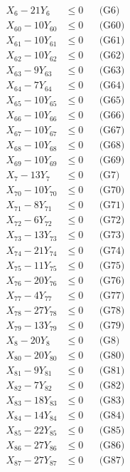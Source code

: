 \documentclass[a4paper,10pt]{article}
\begin{document}
{\begin{align}
X_{6} - 21Y_{6} &\leq 0 && \text{(G6)} \\
X_{60} - 10Y_{60} &\leq 0 && \text{(G60)} \\
X_{61} - 10Y_{61} &\leq 0 && \text{(G61)} \\
X_{62} - 10Y_{62} &\leq 0 && \text{(G62)} \\
X_{63} - 9Y_{63} &\leq 0 && \text{(G63)} \\
X_{64} - 7Y_{64} &\leq 0 && \text{(G64)} \\
X_{65} - 10Y_{65} &\leq 0 && \text{(G65)} \\
X_{66} - 10Y_{66} &\leq 0 && \text{(G66)} \\
X_{67} - 10Y_{67} &\leq 0 && \text{(G67)} \\
X_{68} - 10Y_{68} &\leq 0 && \text{(G68)} \\
X_{69} - 10Y_{69} &\leq 0 && \text{(G69)} \\
X_{7} - 13Y_{7} &\leq 0 && \text{(G7)} \\
\allowbreak
X_{70} - 10Y_{70} &\leq 0 && \text{(G70)} \\
X_{71} - 8Y_{71} &\leq 0 && \text{(G71)} \\
X_{72} - 6Y_{72} &\leq 0 && \text{(G72)} \\
X_{73} - 13Y_{73} &\leq 0 && \text{(G73)} \\
X_{74} - 21Y_{74} &\leq 0 && \text{(G74)} \\
X_{75} - 11Y_{75} &\leq 0 && \text{(G75)} \\
X_{76} - 20Y_{76} &\leq 0 && \text{(G76)} \\
X_{77} - 4Y_{77} &\leq 0 && \text{(G77)} \\
X_{78} - 27Y_{78} &\leq 0 && \text{(G78)} \\
X_{79} - 13Y_{79} &\leq 0 && \text{(G79)} \\
X_{8} - 20Y_{8} &\leq 0 && \text{(G8)} \\
X_{80} - 20Y_{80} &\leq 0 && \text{(G80)} \\
X_{81} - 9Y_{81} &\leq 0 && \text{(G81)} \\
X_{82} - 7Y_{82} &\leq 0 && \text{(G82)} \\
X_{83} - 18Y_{83} &\leq 0 && \text{(G83)} \\
X_{84} - 14Y_{84} &\leq 0 && \text{(G84)} \\
X_{85} - 22Y_{85} &\leq 0 && \text{(G85)} \\
X_{86} - 27Y_{86} &\leq 0 && \text{(G86)} \\
X_{87} - 27Y_{87} &\leq 0 && \text{(G87)} \\

\end{align}}
\end{document}
